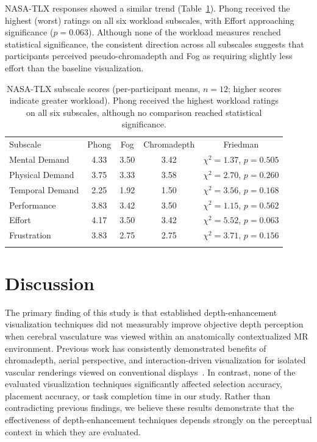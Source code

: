 \documentclass[runningheads]{llncs}
\begin{document}
NASA-TLX responses showed a similar trend (Table~\ref{tab:tlx}). Phong received the highest (worst) ratings on all six workload subscales, with Effort approaching significance ($p=0.063$). Although none of the workload measures reached statistical significance, the consistent direction across all subscales suggests that participants perceived pseudo-chromadepth and Fog as requiring slightly less effort than the baseline visualization.

\begin{table}[t]
\caption{NASA-TLX subscale scores (per-participant means, $n=12$; higher scores indicate greater workload). Phong received the highest workload ratings on all six subscales, although no comparison reached statistical significance.}
\label{tab:tlx}
\centering
\begin{tabular}{lcccc}
\hline\noalign{\smallskip}
Subscale & Phong & Fog & Chromadepth & Friedman \\
\noalign{\smallskip}\hline\noalign{\smallskip}
Mental Demand   & 4.33 & 3.50 & 3.42 & $\chi^2=1.37$, $p=0.505$ \\
Physical Demand & 3.75 & 3.33 & 3.58 & $\chi^2=2.70$, $p=0.260$ \\
Temporal Demand & 2.25 & 1.92 & 1.50 & $\chi^2=3.56$, $p=0.168$ \\
Performance     & 3.83 & 3.42 & 3.50 & $\chi^2=1.15$, $p=0.562$ \\
Effort          & 4.17 & 3.50 & 3.42 & $\chi^2=5.52$, $p=0.063$ \\
Frustration     & 3.83 & 2.75 & 2.75 & $\chi^2=3.71$, $p=0.156$ \\
\noalign{\smallskip}\hline
\end{tabular}
\end{table}

\section{Discussion}

The primary finding of this study is that established depth-enhancement visualization techniques did not measurably improve objective depth perception when cerebral vasculature was viewed within an anatomically contextualized MR environment. Previous work has consistently demonstrated benefits of chromadepth, aerial perspective, and interaction-driven visualization for isolated vascular renderings viewed on conventional displays~\cite{ropinski_visually_2006,kersten-oertel_evaluation_2014,behrendt_combining_2017,drouin_interaction_2018}. In contrast, none of the evaluated visualization techniques significantly affected selection accuracy, placement accuracy, or task completion time in our study. Rather than contradicting previous findings, we believe these results demonstrate that the effectiveness of depth-enhancement techniques depends strongly on the perceptual context in which they are evaluated.
\end{document}
